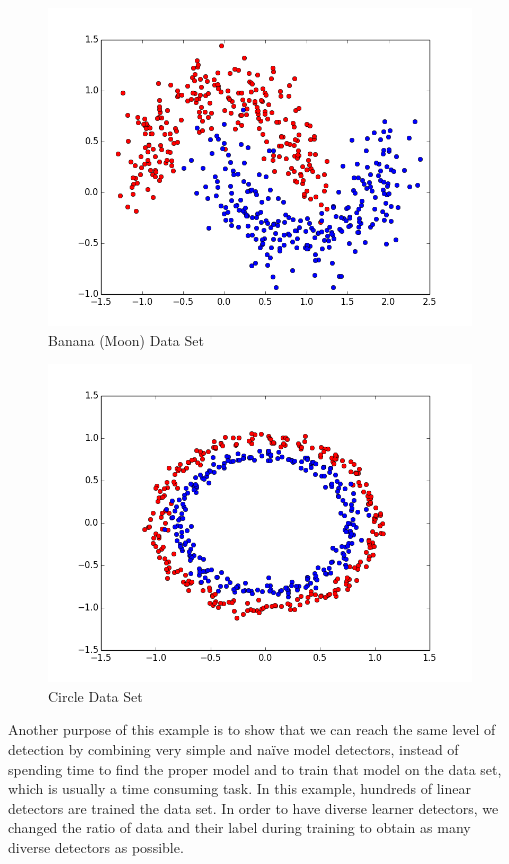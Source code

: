 \begin{figure}[]
\centering
\includegraphics[scale=0.6]{figs/dataset_Banana}
\caption{Banana (Moon) Data Set}
\label{Figure::banana}
\end{figure}

\begin{figure}[]
\centering
\includegraphics[scale=0.6]{figs/dataset_Circle}
\caption{Circle Data Set}
\label{Figure::circle}
\end{figure}

Another purpose of this example is to show that we can reach the same level of detection by combining very simple and naïve model detectors, instead of spending time to find the proper model and to train that model on the data set, which is usually a time consuming task. In this example, hundreds of linear detectors  are trained the data set. In order to have diverse learner detectors, we changed the ratio of data and their label during training to obtain as many diverse detectors as possible.

